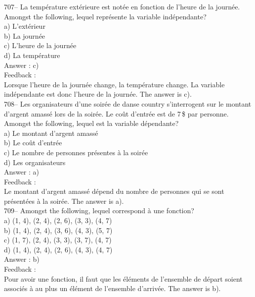 \documentclass[letterpaper, 12pt]{article}
\begin{document}
707-- La temp\'erature ext\'erieure est not\'ee en fonction de l'heure de la
journ\'ee.  Amongst the following, lequel repr\'esente la variable
ind\'ependante?\\
a) L'ext\'erieur\\
b) La journ\'ee\\
c) L'heure de la journ\'ee\\
d) La temp\'erature\\

Answer :  c)\\

Feedback : \\
Lorsque l'heure de la journ\'ee change, la temp\'erature change.  La
variable ind\'ependante est donc l'heure de la journ\'ee.  The answer is
c).\\

708-- Les organisateurs d'une soir\'ee de danse country s'interrogent sur le
montant d'argent amass\'e lors de la soir\'ee.  Le co\^ut d'entr\'ee est de
7\,\$ par personne.  Amongst the following, lequel est la variable
d\'ependante?\\
a) Le montant d'argent amass\'e\\
b) Le co\^ut d'entr\'ee\\
c) Le nombre de personnes pr\'esentes \`a la soir\'ee\\
d) Les organisateurs\\

Answer :  a)\\

Feedback :  \\
Le montant d'argent amass\'e d\'epend du nombre de personnes qui se sont
pr\'esent\'ees \`a la soir\'ee.  The answer is a).\\

709-- Amongst the following, lequel correspond \`a une fonction?\\
a) {(1, 4), (2, 4), (2, 6), (3, 3), (4, 7)}\\
b) {(1, 4), (2, 4), (3, 6), (4, 3), (5, 7)}\\
c) {(1, 7), (2, 4), (3, 3), (3, 7), (4, 7)}\\
d) {(1, 4), (2, 4), (2, 6), (4, 3), (4, 7)}\\

Answer :  b)\\

Feedback :  \\
Pour avoir une fonction, il faut que  les \'el\'ements de l'ensemble de
d\'epart soient associ\'es \`a au plus un \'el\'ement de l'ensemble
d'arriv\'ee.  The answer is b).\\
\end{document}

